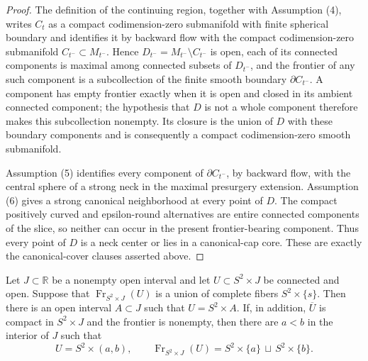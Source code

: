\begin{proof}
The definition of the continuing region, together with Assumption (4),
writes $C_t$ as a compact codimension-zero submanifold with finite spherical
boundary and identifies it by backward flow with the compact
codimension-zero submanifold $C_{t^-}\subset M_{t^-}$.  Hence
$D_{t^-}=M_{t^-}\setminus C_{t^-}$ is open, each of its connected components
is maximal among connected subsets of $D_{t^-}$, and the frontier of any such
component is a subcollection of the finite smooth boundary
$\partial C_{t^-}$.  A component has empty frontier exactly when it is open
and closed in its ambient connected component; the hypothesis that $D$ is not
a whole component therefore makes this subcollection nonempty.  Its closure
is the union of $D$ with these boundary components and is consequently a
compact codimension-zero smooth submanifold.

Assumption (5) identifies every component of $\partial C_{t^-}$, by backward
flow, with the central sphere of a strong neck in the maximal presurgery
extension.  Assumption (6) gives a strong canonical neighborhood at every
point of $D$.  The compact positively curved and epsilon-round alternatives
are entire connected components of the slice, so neither can occur in the
present frontier-bearing component.  Thus every point of $D$ is a neck center
or lies in a canonical-cap core.  These are exactly the canonical-cover
clauses asserted above.
\end{proof}

\begin{lemma}
\label{lem:fiber-saturation-from-spherical-frontier}
\leanok
Let $J\subset\mathbb R$ be a nonempty open interval and let
$U\subset S^2\times J$ be connected and open.  Suppose that
$\operatorname{Fr}_{S^2\times J}(U)$ is a union of complete fibers
$S^2\times\{s\}$.  Then there is an open interval $A\subset J$ such that
$U=S^2\times A$.  If, in addition, $\overline U$ is compact in
$S^2\times J$ and the frontier is nonempty, then there are $a<b$ in the
interior of $J$ such that
\[
 U=S^2\times(a,b),\qquad
 \operatorname{Fr}_{S^2\times J}(U)
 =S^2\times\{a\}\,\sqcup\,S^2\times\{b\}.
\]
\end{lemma}

